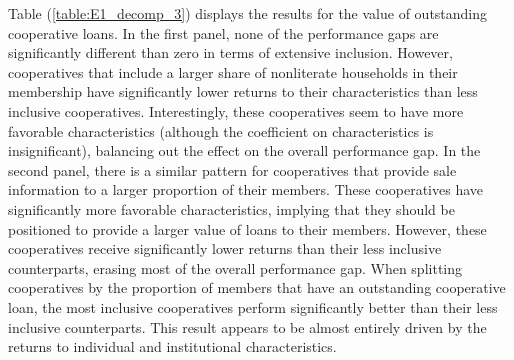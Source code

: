 \documentclass[11pt]{article}
\begin{document}
Table (\ref{table:E1_decomp_3}) displays the results for the value of outstanding cooperative loans. In the first panel, none of the performance gaps are significantly different than zero in terms of extensive inclusion. However, cooperatives that include a larger share of nonliterate households in their membership have significantly lower returns to their characteristics than less inclusive cooperatives. Interestingly, these cooperatives seem to have more favorable characteristics (although the coefficient on characteristics is insignificant), balancing out the effect on the overall performance gap. In the second panel, there is a similar pattern for cooperatives that provide sale information to a larger proportion of their members. These cooperatives have significantly more favorable characteristics, implying that they should be positioned to provide a larger value of loans to their members. However, these cooperatives receive significantly lower returns than their less inclusive counterparts, erasing most of the overall performance gap. When splitting cooperatives by the proportion of members that have an outstanding cooperative loan, the most inclusive cooperatives perform significantly better than their less inclusive counterparts. This result appears to be almost entirely driven by the returns to individual and institutional characteristics. 
\end{document}
